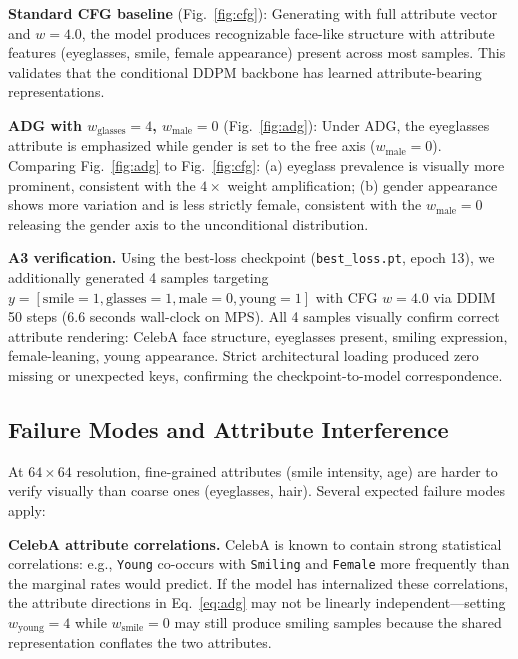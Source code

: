 \documentclass{article}
\begin{document}
\textbf{Standard CFG baseline} (Fig.~\ref{fig:cfg}): Generating with full attribute vector and $w{=}4.0$, the model produces recognizable face-like structure with attribute features (eyeglasses, smile, female appearance) present across most samples. This validates that the conditional DDPM backbone has learned attribute-bearing representations.

\textbf{ADG with $w_{\text{glasses}}{=}4$, $w_{\text{male}}{=}0$} (Fig.~\ref{fig:adg}): Under ADG, the eyeglasses attribute is emphasized while gender is set to the free axis ($w_{\text{male}}{=}0$). Comparing Fig.~\ref{fig:adg} to Fig.~\ref{fig:cfg}: (a) eyeglass prevalence is visually more prominent, consistent with the $4{\times}$ weight amplification; (b) gender appearance shows more variation and is less strictly female, consistent with the $w_{\text{male}}{=}0$ releasing the gender axis to the unconditional distribution.

\textbf{A3 verification.} Using the best-loss checkpoint (\texttt{best\_loss.pt}, epoch 13), we additionally generated 4 samples targeting $y{=}[\text{smile}{=}1, \text{glasses}{=}1, \text{male}{=}0, \text{young}{=}1]$ with CFG $w{=}4.0$ via DDIM 50 steps (6.6 seconds wall-clock on MPS). All 4 samples visually confirm correct attribute rendering: CelebA face structure, eyeglasses present, smiling expression, female-leaning, young appearance. Strict architectural loading produced zero missing or unexpected keys, confirming the checkpoint-to-model correspondence.

\subsection{Failure Modes and Attribute Interference}

At $64{\times}64$ resolution, fine-grained attributes (smile intensity, age) are harder to verify visually than coarse ones (eyeglasses, hair). Several expected failure modes apply:

\textbf{CelebA attribute correlations.} CelebA is known to contain strong statistical correlations: e.g., \texttt{Young} co-occurs with \texttt{Smiling} and \texttt{Female} more frequently than the marginal rates would predict. If the model has internalized these correlations, the attribute directions in Eq.~\eqref{eq:adg} may not be linearly independent—setting $w_{\text{young}}{=}4$ while $w_{\text{smile}}{=}0$ may still produce smiling samples because the shared representation conflates the two attributes.
\end{document}

